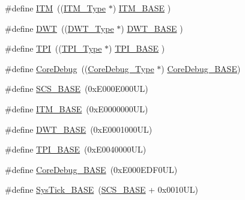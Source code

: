 \begin{DoxyCompactItemize}
\item 
\#define \mbox{\hyperlink{group___c_m_s_i_s__core__base_gabae7cdf882def602cb787bb039ff6a43}{I\+TM}}~((\mbox{\hyperlink{struct_i_t_m___type}{I\+T\+M\+\_\+\+Type}}       $\ast$)     \mbox{\hyperlink{group___c_m_s_i_s__core__base_gadd76251e412a195ec0a8f47227a8359e}{I\+T\+M\+\_\+\+B\+A\+SE}}      )
\item 
\#define \mbox{\hyperlink{group___c_m_s_i_s__core__base_gabbe5a060185e1d5afa3f85b14e10a6ce}{D\+WT}}~((\mbox{\hyperlink{struct_d_w_t___type}{D\+W\+T\+\_\+\+Type}}       $\ast$)     \mbox{\hyperlink{group___c_m_s_i_s__core__base_gafdab534f961bf8935eb456cb7700dcd2}{D\+W\+T\+\_\+\+B\+A\+SE}}      )
\item 
\#define \mbox{\hyperlink{group___c_m_s_i_s__core__base_ga8b4dd00016aed25a0ea54e9a9acd1239}{T\+PI}}~((\mbox{\hyperlink{struct_t_p_i___type}{T\+P\+I\+\_\+\+Type}}       $\ast$)     \mbox{\hyperlink{group___c_m_s_i_s__core__base_ga2b1eeff850a7e418844ca847145a1a68}{T\+P\+I\+\_\+\+B\+A\+SE}}      )
\item 
\#define \mbox{\hyperlink{group___c_m_s_i_s__core__base_gab6e30a2b802d9021619dbb0be7f5d63d}{Core\+Debug}}~((\mbox{\hyperlink{struct_core_debug___type}{Core\+Debug\+\_\+\+Type}} $\ast$)     \mbox{\hyperlink{group___c_m_s_i_s__core__base_ga680604dbcda9e9b31a1639fcffe5230b}{Core\+Debug\+\_\+\+B\+A\+SE}})
\item 
\#define \mbox{\hyperlink{group___c_m_s_i_s__core__base_ga3c14ed93192c8d9143322bbf77ebf770}{S\+C\+S\+\_\+\+B\+A\+SE}}~(0x\+E000\+E000\+U\+L)
\item 
\#define \mbox{\hyperlink{group___c_m_s_i_s__core__base_gadd76251e412a195ec0a8f47227a8359e}{I\+T\+M\+\_\+\+B\+A\+SE}}~(0x\+E0000000\+U\+L)
\item 
\#define \mbox{\hyperlink{group___c_m_s_i_s__core__base_gafdab534f961bf8935eb456cb7700dcd2}{D\+W\+T\+\_\+\+B\+A\+SE}}~(0x\+E0001000\+U\+L)
\item 
\#define \mbox{\hyperlink{group___c_m_s_i_s__core__base_ga2b1eeff850a7e418844ca847145a1a68}{T\+P\+I\+\_\+\+B\+A\+SE}}~(0x\+E0040000\+U\+L)
\item 
\#define \mbox{\hyperlink{group___c_m_s_i_s__core__base_ga680604dbcda9e9b31a1639fcffe5230b}{Core\+Debug\+\_\+\+B\+A\+SE}}~(0x\+E000\+E\+D\+F0\+U\+L)
\item 
\#define \mbox{\hyperlink{group___c_m_s_i_s__core__base_ga58effaac0b93006b756d33209e814646}{Sys\+Tick\+\_\+\+B\+A\+SE}}~(\mbox{\hyperlink{group___c_m_s_i_s__core__base_ga3c14ed93192c8d9143322bbf77ebf770}{S\+C\+S\+\_\+\+B\+A\+SE}} +  0x0010\+U\+L)

\end{DoxyCompactItemize}
